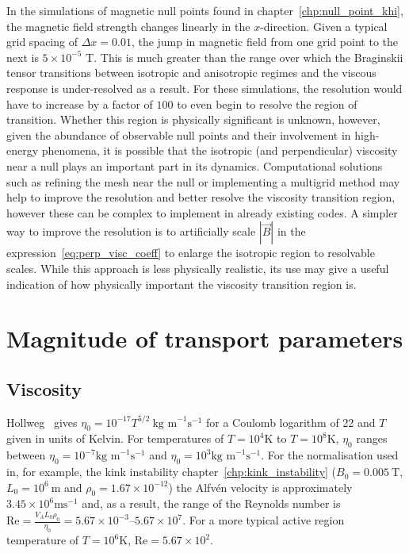 In the simulations of magnetic null points found in chapter~\ref{chp:null_point_khi}, the magnetic field strength changes linearly in the $x$-direction. Given a typical grid spacing of $\Delta x = 0.01$, the jump in magnetic field from one grid point to the next is $5\times 10^{-5}$ T. This is much greater than the range over which the Braginskii tensor transitions between isotropic and anisotropic regimes and the viscous response is under-resolved as a result. For these simulations, the resolution would have to increase by a factor of $100$ to even begin to resolve the region of transition. Whether this region is physically significant is unknown, however, given the abundance of observable null points and their involvement in high-energy phenomena, it is possible that the isotropic (and perpendicular) viscosity near a null plays an important part in its dynamics. Computational solutions such as refining the mesh near the null or implementing a multigrid method may help to improve the resolution and better resolve the viscosity transition region, however these can be complex to implement in already existing codes. A simpler way to improve the resolution is to artificially scale $|\vec{B}|$ in the expression~\ref{eq:perp_visc_coeff} to enlarge the isotropic region to resolvable scales. While this approach is less physically realistic, its use may give a useful indication of how physically important the viscosity transition region is.

\section{Magnitude of transport parameters}

\subsection{Viscosity}

Hollweg~\cite{hollwegViscosityMagnetizedPlasma1985} gives $\eta_0 = 10^{-17} T^{5/2}\ \text{kg m}^{-1} \text{s}^{-1}$ for a Coulomb logarithm of 22 and $T$ given in units of Kelvin. For temperatures of $T=10^4$K to $T=10^8$K, $\eta_0$ ranges between $\eta_0 = 10^{-7} \text{kg m}^{-1} \text{s}^{-1}$ and $\eta_0 = 10^3 \text{kg m}^{-1} \text{s}^{-1}$. For the normalisation used in, for example, the kink instability chapter~\ref{chp:kink_instability} ($B_0 = 0.005\ \text{T}$, $L_0 = 10^6\ \text{m}$ and $\rho_0 = 1.67 \times 10^{-12}$) the Alfv\'en velocity is approximately $3.45 \times 10^6 \text{ms}^{-1}$ and, as a result, the range of the Reynolds number is $\text{Re} = \frac{V_A L_0 \rho_0}{\eta_0} = 5.67 \times 10^{-3}$--$5.67 \times 10^{7}$. For a more typical active region temperature of $T=10^6 \text{K}$, Re$=5.67 \times 10^2$. 

